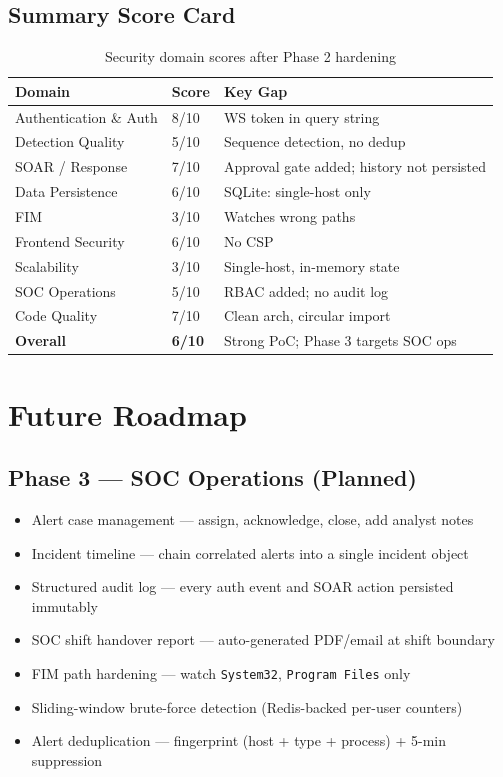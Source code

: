 \documentclass[12pt,a4paper]{article}
\begin{document}
\subsection{Summary Score Card}

\begin{table}[H]
\centering
\begin{tabular}{llp{6cm}}
\toprule
\textbf{Domain} & \textbf{Score} & \textbf{Key Gap} \\
\midrule
Authentication \& Auth & 8/10 & WS token in query string \\
Detection Quality & 5/10 & Sequence detection, no dedup \\
SOAR / Response & 7/10 & Approval gate added; history not persisted \\
Data Persistence & 6/10 & SQLite: single-host only \\
FIM & 3/10 & Watches wrong paths \\
Frontend Security & 6/10 & No CSP \\
Scalability & 3/10 & Single-host, in-memory state \\
SOC Operations & 5/10 & RBAC added; no audit log \\
Code Quality & 7/10 & Clean arch, circular import \\
\textbf{Overall} & \textbf{6/10} & Strong PoC; Phase 3 targets SOC ops \\
\bottomrule
\end{tabular}
\caption{Security domain scores after Phase 2 hardening}
\end{table}

\section{Future Roadmap}

\subsection{Phase 3 — SOC Operations (Planned)}

\begin{itemize}[leftmargin=*, noitemsep]
    \item Alert case management — assign, acknowledge, close, add analyst notes
    \item Incident timeline — chain correlated alerts into a single incident object
    \item Structured audit log — every auth event and SOAR action persisted immutably
    \item SOC shift handover report — auto-generated PDF/email at shift boundary
    \item FIM path hardening — watch \texttt{System32}, \texttt{Program Files} only
    \item Sliding-window brute-force detection (Redis-backed per-user counters)
    \item Alert deduplication — fingerprint (host + type + process) + 5-min suppression
\end{itemize}
\end{document}
